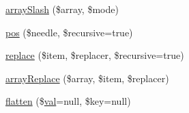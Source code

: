 \begin{DoxyCompactItemize}
\hyperlink{class_pierce_moore_1_1_ruby_p_h_p_1_1r_a61a8836731b261782082897b5fd9a841}{array\-Slash} (\$array, \$mode)
\item 
\hyperlink{class_pierce_moore_1_1_ruby_p_h_p_1_1r_a3792ea27c7c50f1509214cbe67bd62e4}{pos} (\$needle, \$recursive=true)
\item 
\hyperlink{class_pierce_moore_1_1_ruby_p_h_p_1_1r_a00197520cfed5500d7431e09fa4d58a6}{replace} (\$item, \$replacer, \$recursive=true)
\item 
\hyperlink{class_pierce_moore_1_1_ruby_p_h_p_1_1r_a462c50b3bb38143adf421fe36bdc8cc5}{array\-Replace} (\$array, \$item, \$replacer)
\item 
\hyperlink{class_pierce_moore_1_1_ruby_p_h_p_1_1r_ae07220d820951c5ab6e43e05e325e552}{flatten} (\$\hyperlink{class_pierce_moore_1_1_ruby_p_h_p_1_1r_af745c1e6bc71ed38a120043c0cb13416}{val}=null, \$key=null)
\end{DoxyCompactItemize}
